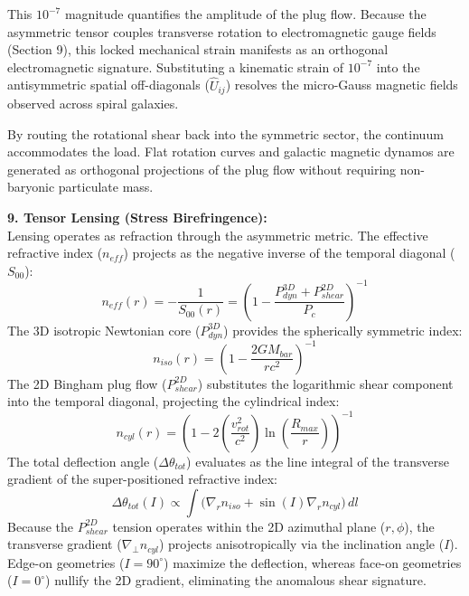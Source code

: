 This $10^{-7}$ magnitude quantifies the amplitude of the plug flow. 
Because the asymmetric tensor couples transverse rotation to electromagnetic gauge fields (Section 9), this locked mechanical strain manifests as an orthogonal electromagnetic signature. Substituting a kinematic strain of $10^{-7}$ into the antisymmetric spatial off-diagonals ($\hat{U}_{ij}$) resolves the micro-Gauss magnetic fields observed across spiral galaxies. 

By routing the rotational shear back into the symmetric sector, the continuum accommodates the load. 
Flat rotation curves and galactic magnetic dynamos are generated as orthogonal projections of the plug flow without requiring non-baryonic particulate mass. 

\vspace{0.2 cm}

\textbf{9. Tensor Lensing (Stress Birefringence):} \\ 
Lensing operates as refraction through the asymmetric metric. The effective refractive index ($n_{eff}$) projects as the negative inverse of the temporal diagonal ($S_{00}$):
\begin{equation}
    n_{eff}(r) = -\frac{1}{S_{00}(r)} = \left( 1 - \frac{P_{dyn}^{3D} + P_{shear}^{2D}}{P_c} \right)^{-1}
\end{equation}
The 3D isotropic Newtonian core ($P_{dyn}^{3D}$) provides the spherically symmetric index:
\begin{equation}
    n_{iso}(r) = \left( 1 - \frac{2G M_{bar}}{r c^2} \right)^{-1}
\end{equation}
The 2D Bingham plug flow ($P_{shear}^{2D}$) substitutes the logarithmic shear component into the temporal diagonal, projecting the cylindrical index:
\begin{equation}
    n_{cyl}(r) = \left( 1 - 2\left(\frac{v_{rot}^2}{c^2}\right) \ln \left( \frac{R_{max}}{r} \right) \right)^{-1}
\end{equation}
The total deflection angle ($\Delta \theta_{tot}$) evaluates as the line integral of the transverse gradient of the super-positioned refractive index:
\begin{equation}
    \Delta \theta_{tot}(I) \propto \int \Big( \nabla_r n_{iso} + \sin(I) \nabla_r n_{cyl} \Big) \, dl
\end{equation}
Because the $P_{shear}^{2D}$ tension operates within the 2D azimuthal plane ($r, \phi$), the transverse gradient ($\nabla_\perp n_{cyl}$) projects anisotropically via the inclination angle ($I$). Edge-on geometries ($I=90^\circ$) maximize the deflection, whereas face-on geometries ($I=0^\circ$) nullify the 2D gradient, eliminating the anomalous shear signature. 

